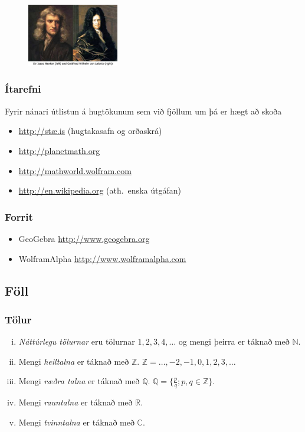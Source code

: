 \documentclass[icelandic,a4paper,12pt]{article}
\newcommand{\C}{{\mathbb  C}}
\newcommand{\Z}{{\mathbb Z}}
\newcommand{\R}{{\mathbb  R}}
\newcommand{\N}{{\mathbb  N}}
\newcommand{\Q}{{\mathbb Q}}
\begin{document}
\begin{figure}
 \includegraphics[width=4cm]{./myndir/kafli01/01_NewtonLeibniz.jpg}
\end{figure}






\subsubsection*{Ítarefni}
 Fyrir nánari útlistun á hugtökunum sem við fjöllum um þá er hægt að skoða
\begin{itemize}
 \item \href{http://stae.is}{http://stæ.is} (hugtakasafn og orðaskrá)
  \item \href{http://planetmath.org}{http://planetmath.org}
  \item \href{http://mathworld.wolfram.com}{http://mathworld.wolfram.com}
  \item \href{http://en.wikipedia.org}{http://en.wikipedia.org} (ath.~enska útgáfan)
\end{itemize}

\pause
\subsubsection*{Forrit}
 \begin{itemize}
  \item GeoGebra \href{http://www.geogebra.org}{http://www.geogebra.org}
  \item WolframAlpha \href{http://www.wolframalpha.com}{http://www.wolframalpha.com}
 \end{itemize}
\subsection*{Föll}	

\subsubsection*{Tölur}
\begin{enumerate}[(i)]
\item  \emph{Náttúrlegu tölurnar} eru tölurnar
$1, 2, 3, 4, \ldots$ og mengi þeirra er táknað með $\N$.   \pause
\item Mengi \emph{heiltalna} er táknað með $\Z$. $\Z = \ldots,-2,-1,0,1,2,3,\ldots$\pause
\item Mengi \emph{ræðra talna} er táknað með $\Q$. $\Q = \{ \frac pq ; p,q \in \Z \}$.\pause
\item Mengi \emph{rauntalna} er táknað með $\R$.\pause
\item Mengi \emph{tvinntalna} er táknað með $\C$.
\end{enumerate}
\end{document}
